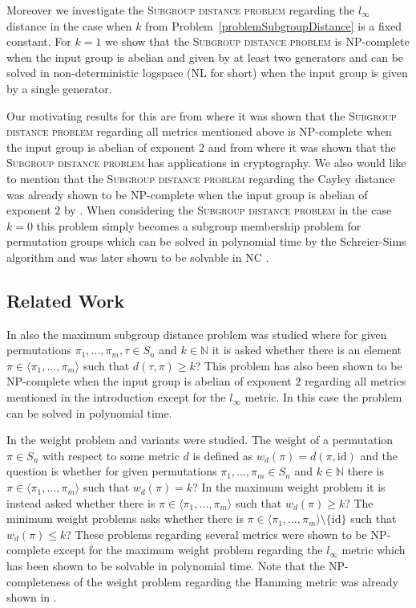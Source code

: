 \documentclass{article}
\begin{document}
Moreover we investigate the \textsc{Subgroup distance problem} regarding the $l_\infty$ distance in the case when $k$ from Problem~\ref{problemSubgroupDistance} is a fixed constant. For $k=1$ we show that the \textsc{Subgroup distance problem} is {\sf NP}-complete when the input group is abelian and given by at least two generators and can be solved in non-deterministic logspace ({\sf NL} for short) when the input group is given by a single generator.

Our motivating results for this are from \cite{buchheim} where it was shown that the \textsc{Subgroup distance problem} regarding all metrics mentioned above is {\sf NP}-complete when the input group is abelian of exponent $2$ and from \cite{onur} where it was shown that the \textsc{Subgroup distance problem} has applications in cryptography. We also would like to mention that the \textsc{Subgroup distance problem} regarding the Cayley distance was already shown to be {\sf NP}-complete when the input group is abelian of exponent $2$ by \cite{pinch}. When considering the \textsc{Subgroup distance problem} in the case $k=0$ this problem simply becomes a subgroup membership problem for permutation groups which can be solved in polynomial time by the Schreier-Sims algorithm \cite{furst,sims} and was later shown to be solvable in {\sf NC} \cite{babai}.

\subsection{Related Work}
In \cite{buchheim} also the maximum subgroup distance problem was studied where for given permutations $\pi_1,\dots,\pi_m,\tau \in S_n$ and $k \in \mathbb{N}$ it is asked whether there is an element $\pi \in \langle \pi_1,\dots,\pi_m \rangle$ such that $d(\tau,\pi) \geq k$? This problem has also been shown to be {\sf NP}-complete when the input group is abelian of exponent $2$ regarding all metrics mentioned in the introduction except for the $l_\infty$ metric. In this case the problem can be solved in polynomial time.

In \cite{cameron} the weight problem and variants were studied. The weight of a permutation $\pi \in S_n$ with respect to some metric $d$ is defined as $w_d(\pi) = d(\pi,\mathrm{id})$ and the question is whether for given permutations $\pi_1,\dots,\pi_m \in S_n$ and $k \in \mathbb{N}$ there is $\pi \in \langle \pi_1,\dots,\pi_m \rangle$ such that $w_d(\pi) = k$? In the maximum weight problem it is instead asked whether there is $\pi \in \langle \pi_1,\dots,\pi_m \rangle$ such that $w_d(\pi) \geq k$? The minimum weight problems asks whether there is $\pi \in \langle \pi_1,\dots,\pi_m \rangle \setminus \{\mathrm{id}\}$ such that $w_d(\pi) \leq k$? These problems regarding several metrics were shown to be {\sf NP}-complete except for the maximum weight problem regarding the $l_\infty$ metric which has been shown to be solvable in polynomial time. Note that the {\sf NP}-completeness of the weight problem regarding the Hamming metric was already shown in \cite{buchheimjunger}.
\end{document}
